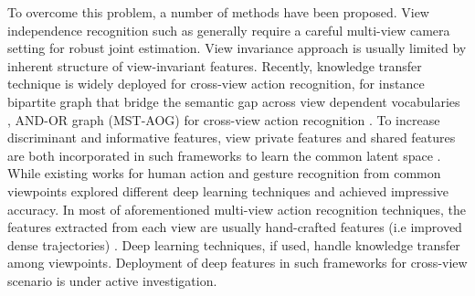         To overcome this problem, a number of methods have been proposed. View independence recognition such as \cite{gavrila19963, lv2007single, weinland2007action} \cite{weinland2011survey} generally require a careful multi-view camera setting for robust joint estimation. View invariance approach \cite{junejo2008cross, li2012cross} is usually limited by inherent structure of view-invariant features. Recently, knowledge transfer technique is widely deployed for cross-view action recognition, for instance bipartite graph that bridge the semantic gap across view dependent vocabularies \cite{liu2011cross}, AND-OR graph (MST-AOG) for cross-view action recognition \cite{wang2014cross}. To increase discriminant and informative features, view private features and shared features are both incorporated in such frameworks to learn the common latent space \cite{kong2017deeply, liu2018hierarchically}. 
        While existing works for human action and gesture recognition from common viewpoints explored different deep learning techniques and achieved impressive accuracy. In most of aforementioned multi-view action recognition techniques, the features extracted from each view are usually hand-crafted features (i.e improved dense trajectories) \cite{rahmani2017learning, liu2018hierarchically,kong2017deeply}. Deep learning techniques, if used, handle knowledge transfer among viewpoints. Deployment of deep features in such frameworks for cross-view scenario is under active investigation.
